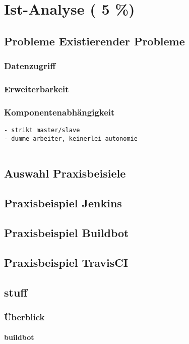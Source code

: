 \chapter{Ist-Analyse ( 5 \%)}
\label{chap:ist-analyse}
\section{Probleme Existierender Probleme}
\subsection{Datenzugriff}
\subsection{Erweiterbarkeit}
\subsection{Komponentenabh\"angigkeit}
\begin{verbatim}
- strikt master/slave
- dumme arbeiter, keinerlei autonomie


\end{verbatim}
\section{Auswahl Praxisbeisiele}
\section{Praxisbeispiel Jenkins}
\section{Praxisbeispiel Buildbot}
\section{Praxisbeispiel TravisCI}

\section{stuff}
\subsection{Überblick}

\subsubsection{buildbot}

